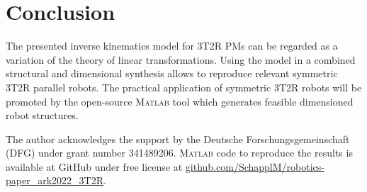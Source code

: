 \documentclass[
	graybox,
	vecphys] %
	{svmult}
\begin{document}

\section{Conclusion}
\label{sec:conclusion}
\vspace{-0.1cm} %

The presented inverse kinematics model for 3T2R PMs can be regarded as a variation of the theory of linear transformations.
Using the model in a combined structural and dimensional synthesis allows to reproduce relevant symmetric 3T2R parallel robots. %
The practical application of symmetric 3T2R robots will be promoted by the open-source \textsc{Matlab} tool which generates feasible dimensioned robot structures. %

\vspace{-0.3cm}
\begin{acknowledgement}
The author acknowledges the support by the Deutsche Forschungsgemeinschaft (DFG) under grant number 341489206. \textsc{Matlab} code to reproduce the results
is available at GitHub under free license at \url{github.com/SchapplM/robotics-paper_ark2022_3T2R}.
%
\end{acknowledgement}

\vspace{-0.5cm}


\end{document}
